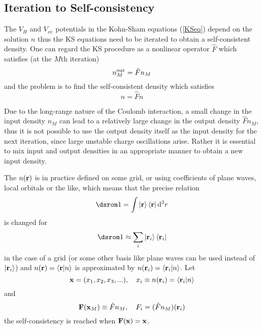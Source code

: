 \subsection{Iteration to Self-consistency}

The $V_H$ and $V_{xc}$ potentials in the Kohn-Sham equations (\ref{KSeq}) depend on the solution $n$ thus the KS equations need to be iterated to obtain a self-consistent density. One can regard the KS procedure as a nonlinear operator $\hat F$ which satisfies (at the $M$th iteration) 
\begin{equation*}
  n_M^{\rm out}=\hat F n_M
\end{equation*}
and the problem is to find the self-consistent density which satisfies 
\begin{equation*}
  n=\hat F n
\end{equation*}

Due to the long-range nature of the Coulomb interaction, a small change in the input density $n_M$ can lead to a relatively large change in the output density $\hat F n_M$, thus it is not possible to use the output density itself as the input density for the next iteration, since large unstable charge oscillations arise. Rather it is essential to mix input and output densities in an appropriate manner to obtain a new input density.

The $n(\bf r)$ is in practice defined on some grid, or using coefficients of plane waves, local orbitals or the like, which means that the precise relation 
\begin{equation*}
  \one=\int \ket{\bf r}\bra{\bf r}\d^3 r
\end{equation*}
is changed for 
\begin{equation*}
  \one\approx\sum_i \ket{{\bf r}_i}\bra{{\bf r}_i}
\end{equation*}
in the case of a grid (or some other basis like plane waves can be used instead of $\mathinner{|{{\bf r}_i}\rangle}$) and $n({\bf r})=\mathinner{\langle{{\bf r}|n}\rangle}$ is approximated by $n({\bf r}_i)=\mathinner{\langle{{\bf r}_i|n}\rangle}$. Let 
\begin{equation*}
  {\bf x}=(x_1,x_2,x_3,...),\quad x_i\equiv n({\bf r}_i)=\mathinner{\langle{{\bf r}_i|n}\rangle}
\end{equation*}
and 
\begin{equation*}
  {\bf F}({\bf x}_M)\equiv \hat F n_M, \quad F_i= (\hat F n_M)({\bf r}_i)
\end{equation*}
the self-consistency is reached when ${\bf F}({\bf x})={\bf x}$.

